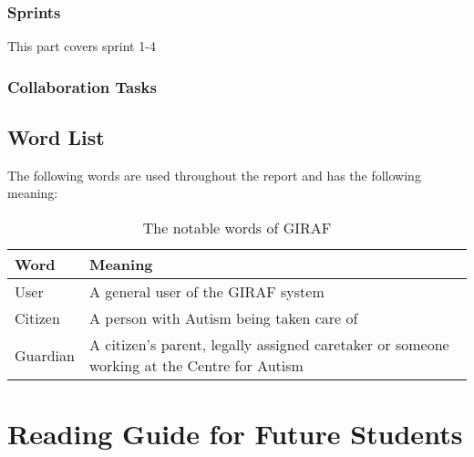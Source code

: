 \subsubsection{Sprints}
This part covers sprint 1-4


\subsubsection{Collaboration Tasks}


\subsection{Word List}
The following words are used throughout the report and has the following
meaning:

\begin{table}[H]
\centering

\begin{tabular}{|l|p{6cm}|}
\hline
\textbf{Word} & \textbf{Meaning} \\ \hline
User & A general user of the GIRAF system \\ \hline
Citizen & A person with Autism being taken care of \\ \hline
Guardian & A citizen's parent, legally assigned caretaker or someone working
at the Centre for Autism\\ \hline
\end{tabular}
\caption{The notable words of GIRAF}
\end{table}


\section{Reading Guide for Future Students}



